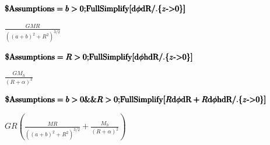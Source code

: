 \documentclass{article}
\begin{document}
\begin{doublespace}
\noindent\(\pmb{\text{$\$$Assumptions} = b>0;}\\
\pmb{\text{FullSimplify}[\text{d$\phi $dR}\text{/.}\{z\text{-$>$}0\}]}\)
\end{doublespace}

\begin{doublespace}
\noindent\(\frac{G M R}{\left((a+b)^2+R^2\right)^{3/2}}\)
\end{doublespace}

\begin{doublespace}
\noindent\(\pmb{\text{$\$$Assumptions} = R>0;}\\
\pmb{\text{FullSimplify}[\text{d$\phi $hdR}\text{/.}\{z\text{-$>$}0\}]}\)
\end{doublespace}

\begin{doublespace}
\noindent\(\frac{G M_h}{(R+\alpha )^2}\)
\end{doublespace}

\begin{doublespace}
\noindent\(\pmb{\text{$\$$Assumptions} = b>0\&\& R>0;}\\
\pmb{\text{FullSimplify}[R \text{d$\phi $dR}+R \text{d$\phi $hdR}\text{/.}\{z\text{-$>$}0\}]}\)
\end{doublespace}

\begin{doublespace}
\noindent\(G R \left(\frac{M R}{\left((a+b)^2+R^2\right)^{3/2}}+\frac{M_h}{(R+\alpha )^2}\right)\)
\end{doublespace}
\end{document}
